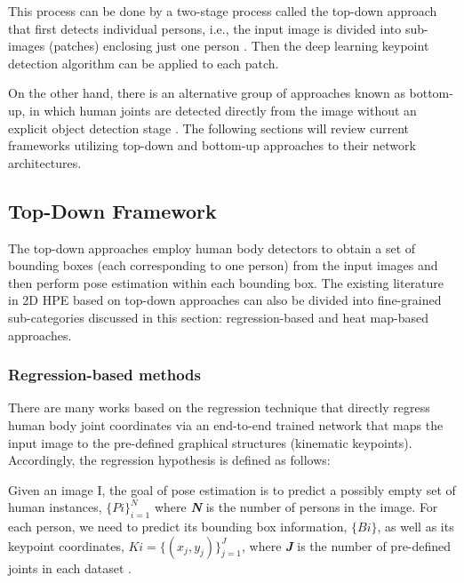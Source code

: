 This process can be done by a two-stage process called the top-down approach that first detects individual persons, i.e., the input image is divided into sub-images (patches) enclosing just one person \cite{sun_deep_2019}. Then the deep learning keypoint detection algorithm can be applied to each patch. 

On the other hand, there is an alternative group of approaches known as bottom-up, in which human joints are detected directly from the image without an explicit object detection stage \cite{cheng_higherhrnet_2020}. The following sections will review current frameworks utilizing top-down and bottom-up approaches to their network architectures.

\subsection{Top-Down Framework}

The top-down approaches employ human body detectors \cite{ren_faster_2016, micilotta_real-time_2006} to obtain a set of bounding boxes (each corresponding to one person) from the input images and then perform pose estimation within each bounding box. The existing literature in 2D HPE based on top-down approaches can also be divided into fine-grained sub-categories discussed in this section: regression-based and heat map-based approaches. 

\subsubsection{Regression-based methods}

There are many works based on the regression technique
\cite{carreira_human_2016, fan_combining_2015, fieraru_learning_2018, li_heterogeneous_2014, qiu_peeking_2020, sun_compositional_2017, sun_integral_2018, toshev_deeppose_2014, wang_graph-pcnn_2020,z} that directly regress human body joint coordinates via an end-to-end trained network that maps the input image to the pre-defined graphical structures (kinematic keypoints). Accordingly, the regression hypothesis is defined as follows:

Given an image I, the goal of pose estimation is to predict a possibly empty set of human instances, $\{Pi\}_{i=1}^N$ where \textbf{\textit{N}} is the number of persons in the image. For each person, we need to predict its bounding box information, $\{Bi\}$, as well as its keypoint coordinates, $Ki=\{(x_j, y_j)\}_{j=1}^J$, where \textbf{\textit{J}} is the number of pre-defined joints in each dataset \cite{li_pose_2021}.

